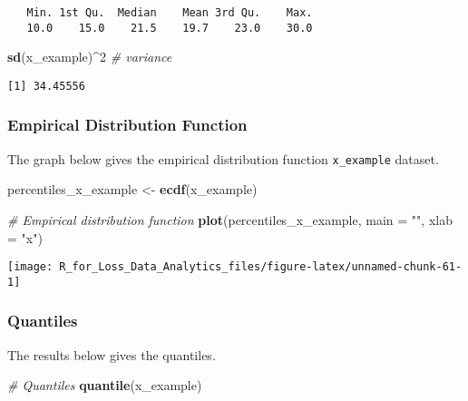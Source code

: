 \documentclass[]{book}
\newenvironment{Shaded}{\begin{snugshade}}{\end{snugshade}}
\newcommand{\KeywordTok}[1]{\textcolor[rgb]{0.13,0.29,0.53}{\textbf{#1}}}
\newcommand{\DataTypeTok}[1]{\textcolor[rgb]{0.13,0.29,0.53}{#1}}
\newcommand{\DecValTok}[1]{\textcolor[rgb]{0.00,0.00,0.81}{#1}}
\newcommand{\StringTok}[1]{\textcolor[rgb]{0.31,0.60,0.02}{#1}}
\newcommand{\CommentTok}[1]{\textcolor[rgb]{0.56,0.35,0.01}{\textit{#1}}}
\newcommand{\OperatorTok}[1]{\textcolor[rgb]{0.81,0.36,0.00}{\textbf{#1}}}
\newcommand{\NormalTok}[1]{#1}
\theoremstyle{definition}
\theoremstyle{definition}
\theoremstyle{definition}
\theoremstyle{remark}
\begin{document}
\begin{verbatim}
   Min. 1st Qu.  Median    Mean 3rd Qu.    Max. 
   10.0    15.0    21.5    19.7    23.0    30.0 
\end{verbatim}

\begin{Shaded}
\begin{Highlighting}[]
\KeywordTok{sd}\NormalTok{(x_example)}\OperatorTok{^}\DecValTok{2}  \CommentTok{# variance }
\end{Highlighting}
\end{Shaded}

\begin{verbatim}
[1] 34.45556
\end{verbatim}

\subsubsection{Empirical Distribution
Function}\label{empirical-distribution-function}

The graph below gives the empirical distribution function
\texttt{x\_example} dataset.

\begin{Shaded}
\begin{Highlighting}[]
\NormalTok{percentiles_x_example <-}\StringTok{ }\KeywordTok{ecdf}\NormalTok{(x_example)}

\CommentTok{# Empirical distribution function}
\KeywordTok{plot}\NormalTok{(percentiles_x_example, }\DataTypeTok{main =} \StringTok{""}\NormalTok{, }\DataTypeTok{xlab =} \StringTok{"x"}\NormalTok{)}
\end{Highlighting}
\end{Shaded}

\begin{center}\texttt{[image: R\_for\_Loss\_Data\_Analytics\_files/figure-latex/unnamed-chunk-61-1]} \end{center}

\subsubsection{Quantiles}\label{quantiles}

The results below gives the quantiles.

\begin{Shaded}
\begin{Highlighting}[]
\CommentTok{# Quantiles }
\KeywordTok{quantile}\NormalTok{(x_example)}
\end{Highlighting}
\end{Shaded}
\end{document}
